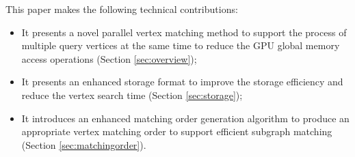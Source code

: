 

This paper makes the following technical contributions:
 \begin{itemize}
\item It presents a novel parallel vertex matching method to support the process of multiple query vertices at the same time to reduce
    the GPU global memory access operations (Section \ref {sec:overview});
\item It presents an enhanced storage format to improve the storage efficiency and reduce the vertex search time (Section
    \ref{sec:storage});
\item It introduces an enhanced matching order generation algorithm to produce an appropriate vertex matching order to support efficient
    subgraph matching (Section \ref {sec:matchingorder}).
\end{itemize}



